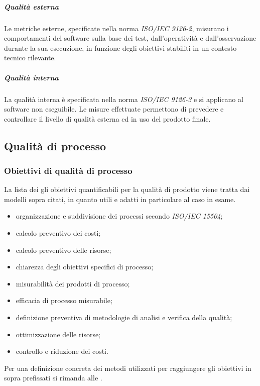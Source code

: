 \documentclass[12pt,a4paper]{article}
\begin{document}
\subparagraph{Qualità esterna}
Le metriche esterne, specificate nella norma \textit{ISO/IEC 9126-2}, misurano i comportamenti del software sulla base dei test, dall'operatività e dall'osservazione durante la sua esecuzione, in funzione degli obiettivi stabiliti in un contesto tecnico rilevante.

\subparagraph{Qualità interna}
La qualità interna è specificata nella norma \textit{ISO/IEC 9126-3} e si applicano al software non eseguibile. Le misure effettuate permettono di prevedere e controllare il livello di qualità esterna ed in uso del prodotto finale.

\subsection{Qualità di processo}

\subsubsection{Obiettivi di qualità di processo}
La lista dei gli obiettivi quantificabili per la qualità di prodotto viene tratta dai modelli sopra citati, in quanto utili e adatti in particolare al caso in esame.
\begin{itemize}
	\item organizzazione e suddivisione dei processi secondo \textit{ISO/IEC 15504};
	\item calcolo preventivo dei costi;
	\item calcolo preventivo delle risorse;
	\item chiarezza degli obiettivi specifici di processo;
	\item misurabilità dei prodotti di processo;
	\item efficacia di processo misurabile;
	\item definizione preventiva di metodologie di analisi e verifica della qualità;
	\item ottimizzazione delle risorse;
	\item controllo e riduzione dei costi.
\end{itemize}
Per una definizione concreta dei metodi utilizzati per raggiungere gli obiettivi in sopra prefissati si rimanda alle \NdP{}.
\end{document}
